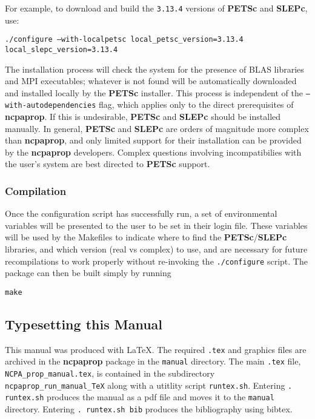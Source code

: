 \noindent For example, to download and build the \texttt{3.13.4} versions of \textbf{PETSc} and \textbf{SLEPc}, use:

\texttt{./configure --with-localpetsc local\_petsc\_version=3.13.4 local\_slepc\_version=3.13.4}

\noindent The installation process will check the system for the presence of BLAS libraries and MPI executables; whatever is not found will be automatically downloaded and installed locally by the \textbf{PETSc} installer.  This process is independent of the \texttt{--with-autodependencies} flag, which applies only to the direct prerequisites of \textbf{ncpaprop}.  If this is undesirable, \textbf{PETSc} and \textbf{SLEPc} should be installed manually.  In general, \textbf{PETSc} and \textbf{SLEPc} are orders of magnitude more complex than \textbf{ncpaprop}, and only limited support for their installation can be provided by the \textbf{ncpaprop} developers.  Complex questions involving incompatibilies with the user's system are best directed to \textbf{PETSc} support.

\subsubsection{Compilation}

Once the configuration script has successfully run, a set of environmental variables will be presented to the user to be set in their login file.  These variables will be used by the Makefiles to indicate where to find the \textbf{PETSc}/\textbf{SLEPc} libraries, and which version (real vs complex) to use, and are necessary for future recompilations to work properly without re-invoking the \texttt{./configure} script.  The package can then be built simply by running

\texttt{make}


\subsection{Typesetting this Manual}

This manual was produced with LaTeX. The required \verb+.tex+ and graphics files are archived in the \textbf{ncpaprop} package in the \verb+manual+ directory. The main \verb+.tex+ file, \verb+NCPA_prop_manual.tex+, is contained in the subdirectory \verb+ncpaprop_run_manual_TeX+ along with a utitlity script \verb+runtex.sh+. Entering \verb+. runtex.sh+ produces the manual as a pdf file and moves it to the \verb+manual+ directory. Entering \verb+. runtex.sh bib+ produces the bibliography using bibtex. 
